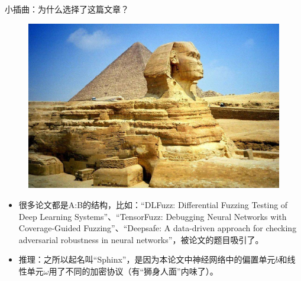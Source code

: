 \documentclass{beamer}
\begin{document}
\begin{frame}{小插曲：为什么选择了这篇文章？}
	\begin{figure}[h]
    	\centering
        \includegraphics[height=.3\textheight]{pic/sphinx.jpeg}
    \end{figure} 
	\begin{itemize}
        \item \small {很多论文都是A:B的结构，比如：“DLFuzz: Differential Fuzzing Testing of Deep Learning Systems”、“TensorFuzz: Debugging Neural Networks with Coverage-Guided Fuzzing”、“Deepsafe: A data-driven approach for checking adversarial robustness in neural networks”，被论文的题目吸引了。}
        \item \small {{\color {blue} 推理：之所以起名叫“Sphinx”，是因为本论文中神经网络中的偏置单元$b$和线性单元$\omega$用了不同的加密协议（有“狮身人面”内味了）。}}
    \end{itemize}
\end{frame}
\end{document}
